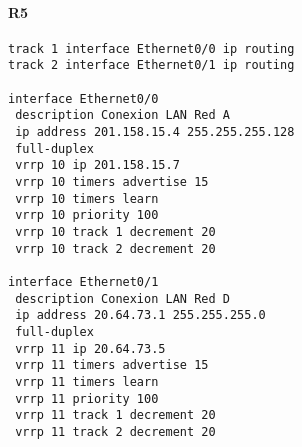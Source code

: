 \paragraph{R5}
{\small
\begin{verbatim}
track 1 interface Ethernet0/0 ip routing
track 2 interface Ethernet0/1 ip routing

interface Ethernet0/0
 description Conexion LAN Red A
 ip address 201.158.15.4 255.255.255.128
 full-duplex
 vrrp 10 ip 201.158.15.7
 vrrp 10 timers advertise 15
 vrrp 10 timers learn
 vrrp 10 priority 100
 vrrp 10 track 1 decrement 20
 vrrp 10 track 2 decrement 20

interface Ethernet0/1
 description Conexion LAN Red D
 ip address 20.64.73.1 255.255.255.0
 full-duplex
 vrrp 11 ip 20.64.73.5
 vrrp 11 timers advertise 15
 vrrp 11 timers learn
 vrrp 11 priority 100
 vrrp 11 track 1 decrement 20
 vrrp 11 track 2 decrement 20
\end{verbatim}
}
